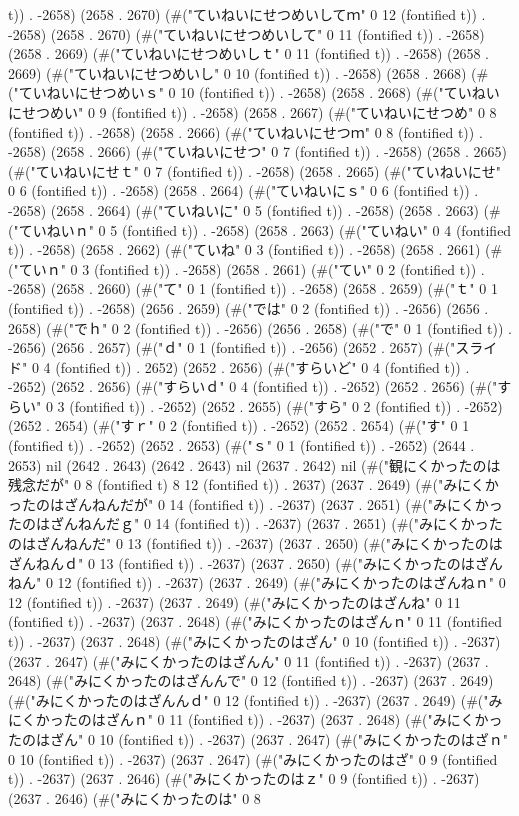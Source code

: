 t)) . -2658) (2658 . 2670) (#("ていねいにせつめいしてｍ" 0 12 (fontified t)) . -2658) (2658 . 2670) (#("ていねいにせつめいして" 0 11 (fontified t)) . -2658) (2658 . 2669) (#("ていねいにせつめいしｔ" 0 11 (fontified t)) . -2658) (2658 . 2669) (#("ていねいにせつめいし" 0 10 (fontified t)) . -2658) (2658 . 2668) (#("ていねいにせつめいｓ" 0 10 (fontified t)) . -2658) (2658 . 2668) (#("ていねいにせつめい" 0 9 (fontified t)) . -2658) (2658 . 2667) (#("ていねいにせつめ" 0 8 (fontified t)) . -2658) (2658 . 2666) (#("ていねいにせつｍ" 0 8 (fontified t)) . -2658) (2658 . 2666) (#("ていねいにせつ" 0 7 (fontified t)) . -2658) (2658 . 2665) (#("ていねいにせｔ" 0 7 (fontified t)) . -2658) (2658 . 2665) (#("ていねいにせ" 0 6 (fontified t)) . -2658) (2658 . 2664) (#("ていねいにｓ" 0 6 (fontified t)) . -2658) (2658 . 2664) (#("ていねいに" 0 5 (fontified t)) . -2658) (2658 . 2663) (#("ていねいｎ" 0 5 (fontified t)) . -2658) (2658 . 2663) (#("ていねい" 0 4 (fontified t)) . -2658) (2658 . 2662) (#("ていね" 0 3 (fontified t)) . -2658) (2658 . 2661) (#("ていｎ" 0 3 (fontified t)) . -2658) (2658 . 2661) (#("てい" 0 2 (fontified t)) . -2658) (2658 . 2660) (#("て" 0 1 (fontified t)) . -2658) (2658 . 2659) (#("ｔ" 0 1 (fontified t)) . -2658) (2656 . 2659) (#("では" 0 2 (fontified t)) . -2656) (2656 . 2658) (#("でｈ" 0 2 (fontified t)) . -2656) (2656 . 2658) (#("で" 0 1 (fontified t)) . -2656) (2656 . 2657) (#("ｄ" 0 1 (fontified t)) . -2656) (2652 . 2657) (#("スライド" 0 4 (fontified t)) . 2652) (2652 . 2656) (#("すらいど" 0 4 (fontified t)) . -2652) (2652 . 2656) (#("すらいｄ" 0 4 (fontified t)) . -2652) (2652 . 2656) (#("すらい" 0 3 (fontified t)) . -2652) (2652 . 2655) (#("すら" 0 2 (fontified t)) . -2652) (2652 . 2654) (#("すｒ" 0 2 (fontified t)) . -2652) (2652 . 2654) (#("す" 0 1 (fontified t)) . -2652) (2652 . 2653) (#("ｓ" 0 1 (fontified t)) . -2652) (2644 . 2653) nil (2642 . 2643) (2642 . 2643) nil (2637 . 2642) nil (#("観にくかったのは残念だが" 0 8 (fontified t) 8 12 (fontified t)) . 2637) (2637 . 2649) (#("みにくかったのはざんねんだが" 0 14 (fontified t)) . -2637) (2637 . 2651) (#("みにくかったのはざんねんだｇ" 0 14 (fontified t)) . -2637) (2637 . 2651) (#("みにくかったのはざんねんだ" 0 13 (fontified t)) . -2637) (2637 . 2650) (#("みにくかったのはざんねんｄ" 0 13 (fontified t)) . -2637) (2637 . 2650) (#("みにくかったのはざんねん" 0 12 (fontified t)) . -2637) (2637 . 2649) (#("みにくかったのはざんねｎ" 0 12 (fontified t)) . -2637) (2637 . 2649) (#("みにくかったのはざんね" 0 11 (fontified t)) . -2637) (2637 . 2648) (#("みにくかったのはざんｎ" 0 11 (fontified t)) . -2637) (2637 . 2648) (#("みにくかったのはざん" 0 10 (fontified t)) . -2637) (2637 . 2647) (#("みにくかったのはざんん" 0 11 (fontified t)) . -2637) (2637 . 2648) (#("みにくかったのはざんんで" 0 12 (fontified t)) . -2637) (2637 . 2649) (#("みにくかったのはざんんｄ" 0 12 (fontified t)) . -2637) (2637 . 2649) (#("みにくかったのはざんｎ" 0 11 (fontified t)) . -2637) (2637 . 2648) (#("みにくかったのはざん" 0 10 (fontified t)) . -2637) (2637 . 2647) (#("みにくかったのはざｎ" 0 10 (fontified t)) . -2637) (2637 . 2647) (#("みにくかったのはざ" 0 9 (fontified t)) . -2637) (2637 . 2646) (#("みにくかったのはｚ" 0 9 (fontified t)) . -2637) (2637 . 2646) (#("みにくかったのは" 0 8 